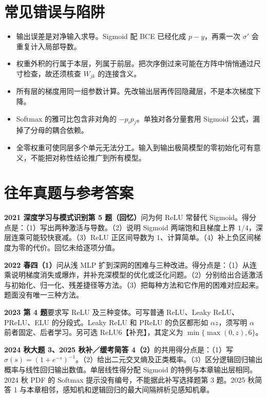 \documentclass[UTF8,a4paper,zihao=-4,fontset=fandol]{ctexrep}
\begin{document}
\section{常见错误与陷阱}

\begin{itemize}
\item 输出误差是对净输入求导。Sigmoid 配 BCE 已经化成 $p-y$，再乘一次 $\sigma'$ 会重复计入局部导数。
\item 权重外积的行属于本层，列属于前层。把次序倒过来可能在方阵中悄悄通过尺寸检查，故还须核查 $W_{jk}$ 的连接含义。
\item 所有层的梯度用同一组参数计算。先改输出层再传回隐藏层，不是本次梯度下降。
\item Softmax 的雅可比包含非对角的 $-p_i p_j$。单独对各分量套用 Sigmoid 公式，漏掉了分母的耦合依赖。
\item 全零权重可使同层多个单元无法分工。输入到输出极简模型的零初始化可有意义，不能把对称性结论推广到所有模型。
\end{itemize}

\section{往年真题与参考答案}

\textbf{2021 深度学习与模式识别第 5 题（回忆）}问为何 ReLU 常替代 Sigmoid。得分点是：（1）写出两种激活与导数。（2）说明 Sigmoid 两端饱和且梯度上界 $1/4$，深层连乘可能较快衰减。（3）ReLU 正区间导数为 $1$、计算简单。（4）补上负区间梯度为零的代价。回忆未给逐项分值。

\textbf{2022 春四（1）}问从浅 MLP 扩到深网的困难与三种改进。得分点是：（1）从连乘说明梯度消失或爆炸，并补充深模型的优化或泛化问题。（2）分别给出合适激活与初始化、归一化、残差捷径等方法。（3）把每种方法和它作用的困难对应起来。题面没有唯一三种方法。

\textbf{2023 第 4 题}要求写 ReLU 及三种变体。可写普通 ReLU、Leaky ReLU、PReLU、ELU 的分段式。Leaky ReLU 和 PReLU 的负区都形如 $\alpha z$，须写明 $\alpha$ 前者固定、后者学习。另可选 ReLU6【补充】，其定义为 $\min\{\max(0,z),6\}$。

\textbf{2024 秋大题 3、2025 秋补／缓考简答 4（2）}的共用得分点是：（1）写 $\sigma(s)=(1+e^{-s})^{-1}$。（2）给出二元交叉熵及正类概率。（3）区分逻辑回归输出概率与线性回归输出数值。单层线性得分配 Sigmoid 的特例与本章输出层相同。2024 秋 PDF 的 Softmax 提示没有编号，不能据此补写选择题第 3 题。2025 秋简答 1 与本章相邻，感知机和逻辑回归的最大间隔辨析见感知机章。

\end{document}
